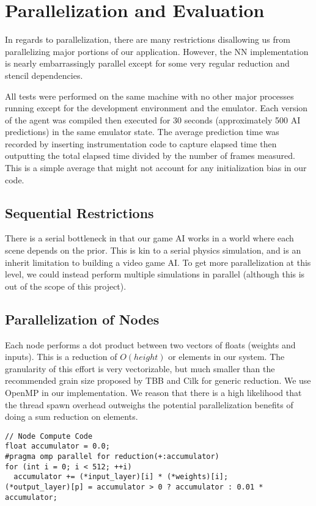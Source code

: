\section*{Parallelization and Evaluation}

\label{parallel}
In regards to parallelization, there are many restrictions disallowing us from parallelizing major portions of our application.
However, the NN implementation is nearly embarrassingly parallel except for some very regular reduction and stencil dependencies.

All tests were performed on the same machine with no other major processes running except for the development environment and the emulator.
Each version of the agent was compiled then executed for 30 seconds (approximately 500 AI predictions) in the same emulator state.
The average prediction time was recorded by inserting instrumentation code to capture elapsed time then outputting the total elapsed time divided by the number of frames measured.
This is a simple average that might not account for any initialization bias in our code.

\subsection*{Sequential Restrictions}
There is a serial bottleneck in that our game AI works in a world where each scene depends on the prior.
This is kin to a serial physics simulation, and is an inherit limitation to building a video game AI.
To get more parallelization at this level, we could instead perform multiple simulations in parallel (although this is out of the scope of this project).

\subsection*{Parallelization of Nodes}
Each node performs a dot product between two vectors of \netheight floats (weights and inputs).
This is a reduction of $O(height)$ or \netheight elements in our system.
The granularity of this effort is very vectorizable, but much smaller than the recommended grain size proposed by TBB and Cilk for generic reduction.
We use OpenMP in our implementation. 
We reason that there is a high likelihood that the thread spawn overhead outweighs the potential parallelization benefits of doing a sum reduction on \netheight elements.

\begin{lstlisting}
// Node Compute Code
float accumulator = 0.0;
#pragma omp parallel for reduction(+:accumulator)
for (int i = 0; i < 512; ++i)
  accumulator += (*input_layer)[i] * (*weights)[i];
(*output_layer)[p] = accumulator > 0 ? accumulator : 0.01 * accumulator;
\end{lstlisting}

